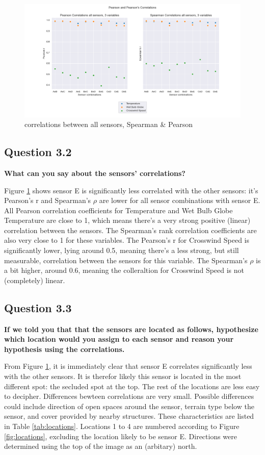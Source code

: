 \documentclass{report}
\begin{document}
	\begin{figure}[H]
		\centering
		\includegraphics[width=\linewidth]{GEO1001_hw01_images/GEO1001_hw01_A3_correlations.png}
		\caption{correlations between all sensors, Spearman \& Pearson}
		\label{fig:corr}
	\end{figure}
	
	
	\subsection{Question 3.2}
	\textbf{What can you say about the sensors’ correlations?}
	
	Figure \ref{fig:corr} shows sensor E is significantly less correlated with the other sensors: it's Pearson's r and Spearman's $\rho$ are lower for all sensor combinations with sensor E. All Pearson correlation coefficients for Temperature and Wet Bulb Globe Temperature are close to 1, which means there's a very strong positive (linear) correlation between the sensors. The Spearman's rank correlation coefficients are also very close to 1 for these variables. The Pearson's r for Crosswind Speed is significantly lower, lying around 0.5, meaning there's a less strong, but still measurable, correlation between the sensors for this variable. The Spearman's $\rho$ is a bit higher, around 0.6, meaning the colleraltion for Crosswind Speed is not (completely) linear.
	
	\subsection{Question 3.3}
	\textbf{If we told you that that the sensors are located as follows, hypothesize which location would you assign to each sensor and reason your hypothesis using the correlations.}
	
	From Figure \ref{fig:corr}, it is immediately clear that sensor E correlates significantly less with the other sensors. It is therefor likely this sensor is located in the most different spot: the secluded spot at the top. The rest of the locations are less easy to decipher. Differences bewteen correlations are very small. Possible differences could include direction of open spaces around the sensor, terrain type below the sensor, and cover provided by nearby structures. These characteristics are listed in Table \ref{tab:locations}. Locations 1 to 4 are numbered according to Figure \ref{fig:locations}, excluding the location likely to be sensor E. Directions were determined using the top of the image as an (arbitary) north. 
	
\end{document}
